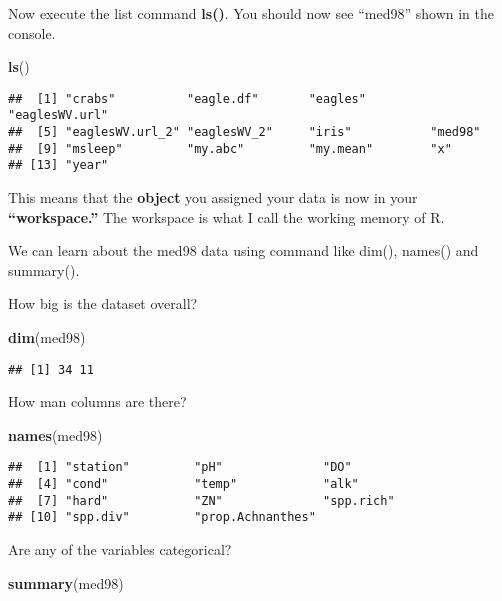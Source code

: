 \documentclass[]{book}
\newenvironment{Shaded}{\begin{snugshade}}{\end{snugshade}}
\newcommand{\KeywordTok}[1]{\textcolor[rgb]{0.13,0.29,0.53}{\textbf{#1}}}
\newcommand{\NormalTok}[1]{#1}
\theoremstyle{definition}
\theoremstyle{definition}
\theoremstyle{definition}
\theoremstyle{remark}
\begin{document}
Now execute the list command \textbf{ls()}. You should now see ``med98''
shown in the console.

\begin{Shaded}
\begin{Highlighting}[]
\KeywordTok{ls}\NormalTok{()}
\end{Highlighting}
\end{Shaded}

\begin{verbatim}
##  [1] "crabs"          "eagle.df"       "eagles"         "eaglesWV.url"  
##  [5] "eaglesWV.url_2" "eaglesWV_2"     "iris"           "med98"         
##  [9] "msleep"         "my.abc"         "my.mean"        "x"             
## [13] "year"
\end{verbatim}

This means that the \textbf{object} you assigned your data is now in
your \textbf{``workspace.''} The workspace is what I call the working
memory of R.

We can learn about the med98 data using command like dim(), names() and
summary().

How big is the dataset overall?

\begin{Shaded}
\begin{Highlighting}[]
\KeywordTok{dim}\NormalTok{(med98)}
\end{Highlighting}
\end{Shaded}

\begin{verbatim}
## [1] 34 11
\end{verbatim}

How man columns are there?

\begin{Shaded}
\begin{Highlighting}[]
\KeywordTok{names}\NormalTok{(med98)}
\end{Highlighting}
\end{Shaded}

\begin{verbatim}
##  [1] "station"         "pH"              "DO"             
##  [4] "cond"            "temp"            "alk"            
##  [7] "hard"            "ZN"              "spp.rich"       
## [10] "spp.div"         "prop.Achnanthes"
\end{verbatim}

Are any of the variables categorical?

\begin{Shaded}
\begin{Highlighting}[]
\KeywordTok{summary}\NormalTok{(med98)}
\end{Highlighting}
\end{Shaded}
\end{document}
